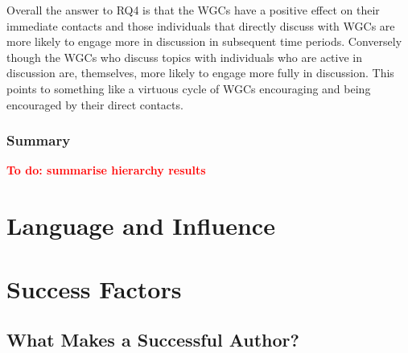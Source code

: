 \documentclass[twocolumn,10pt]{article}
\newcommand{\todo}[1]{\textbf{\textcolor{red}{To do: #1}}}
\begin{document}
Overall the answer to RQ4 is that the WGCs have a positive effect on their
immediate contacts and those individuals that directly discuss with WGCs
are more likely to engage more in discussion in subsequent time periods.
Conversely though the WGCs who discuss topics with individuals who are
active in discussion are, themselves, more likely to engage more fully in
discussion. This points to something like a virtuous cycle of WGCs
encouraging and being encouraged by their direct contacts. 

\subsubsection{Summary}


\todo{summarise hierarchy results}

\section{Language and Influence}
\label{sec:language}






\section{Success Factors}
\label{sec:success-factors}

\subsection{What Makes a Successful Author?}
\end{document}
